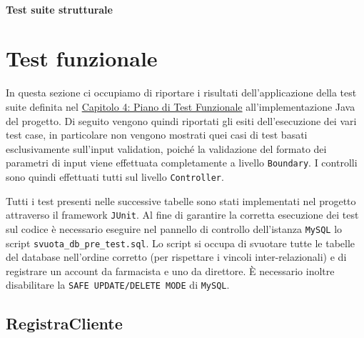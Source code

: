 \vfill
\pagebreak

\paragraph{Test suite strutturale}\mbox{}\newline




\section{Test funzionale}
In questa sezione ci occupiamo di riportare i risultati dell'applicazione della test suite definita nel \hyperref[cap:piano_test_funzionale]{Capitolo 4: Piano di Test Funzionale} all'implementazione Java del progetto. Di seguito vengono quindi riportati gli esiti dell'esecuzione dei vari test case, in particolare non vengono mostrati quei casi di test basati esclusivamente sull'input validation, poiché la validazione del formato dei parametri di input viene effettuata completamente a livello \texttt{Boundary}. I controlli sono quindi effettuati tutti sul livello \texttt{Controller}.

Tutti i test presenti nelle successive tabelle sono stati implementati nel progetto attraverso il framework \texttt{JUnit}. Al fine di garantire la corretta esecuzione dei test sul codice è necessario eseguire nel pannello di controllo dell'istanza \texttt{MySQL} lo script \texttt{svuota\_db\_pre\_test.sql}. Lo script si occupa di svuotare tutte le tabelle del database nell'ordine corretto (per rispettare i vincoli inter-relazionali) e di registrare un account da farmacista e uno da direttore. È necessario inoltre disabilitare la \texttt{SAFE UPDATE/DELETE MODE} di \texttt{MySQL}.

\subsection{RegistraCliente}

